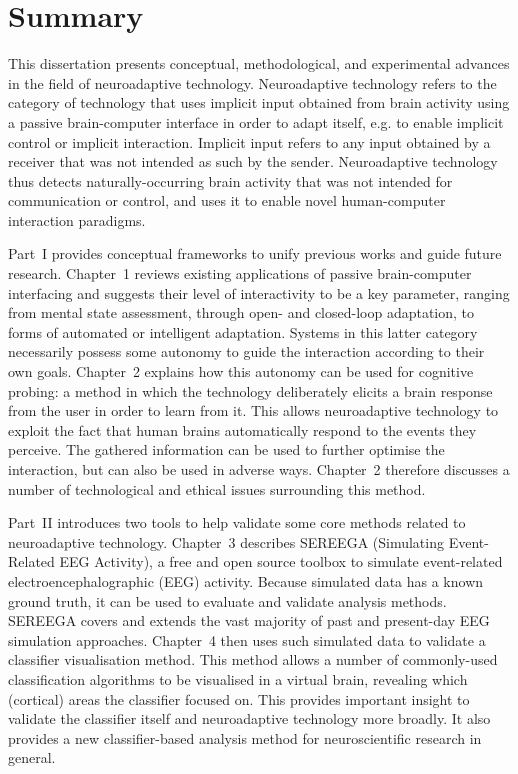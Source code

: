 \documentclass[a4paper,11pt]{article}
\begin{document}
\section*{Summary}

This dissertation presents conceptual, methodological, and experimental advances in the field of neuroadaptive technology. Neuroadaptive technology refers to the category of technology that uses implicit input obtained from brain activity using a passive brain-computer interface in order to adapt itself, e.g. to enable implicit control or implicit interaction. Implicit input refers to any input obtained by a receiver that was not intended as such by the sender. Neuroadaptive technology thus detects naturally-occurring brain activity that was not intended for communication or control, and uses it to enable novel human-computer interaction paradigms. 

Part~I provides conceptual frameworks to unify previous works and guide future research. Chapter~1 reviews existing applications of passive brain-computer interfacing and suggests their level of interactivity to be a key parameter, ranging from mental state assessment, through open- and closed-loop adaptation, to forms of automated or intelligent adaptation. Systems in this latter category necessarily possess some autonomy to guide the interaction according to their own goals. Chapter~2 explains how this autonomy can be used for cognitive probing: a method in which the technology deliberately elicits a brain response from the user in order to learn from it. This allows neuroadaptive technology to exploit the fact that human brains automatically respond to the events they perceive. The gathered information can be used to further optimise the interaction, but can also be used in adverse ways. Chapter~2 therefore discusses a number of technological and ethical issues surrounding this method.

Part~II introduces two tools to help validate some core methods related to neuroadaptive technology. Chapter~3 describes SEREEGA (Simulating Event-Related EEG Activity), a free and open source toolbox to simulate event-related electroencephalographic (EEG) activity. Because simulated data has a known ground truth, it can be used to evaluate and validate analysis methods. SEREEGA covers and extends the vast majority of past and present-day EEG simulation approaches. Chapter~4 then uses such simulated data to validate a classifier visualisation method. This method allows a number of commonly-used classification algorithms to be visualised in a virtual brain, revealing which (cortical) areas the classifier focused on. This provides important insight to validate the classifier itself and neuroadaptive technology more broadly. It also provides a new classifier-based analysis method for neuroscientific research in general.
\end{document}
